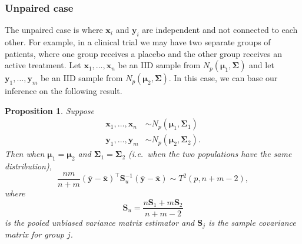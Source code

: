 \documentclass[
]{book}
\newtheorem{proposition}{Proposition}[chapter]
\theoremstyle{definition}
\theoremstyle{definition}
\theoremstyle{definition}
\theoremstyle{definition}
\theoremstyle{remark}
\begin{document}
\subsubsection*{Unpaired case}\label{unpaired-case}

The unpaired case is where \(\mathbf x_i\) and \(\mathbf y_i\) are independent and not connected to each other. For example, in a clinical trial we may have two separate groups of patients, where one group receives a placebo and the other group receives an active treatment. Let \(\mathbf x_1,\ldots,\mathbf x_n\) be an IID sample from \(N_p({\boldsymbol{\mu}}_1,\boldsymbol{\Sigma})\) and let \(\mathbf y_1,\ldots,\mathbf y_m\) be an IID sample from \(N_p({\boldsymbol{\mu}}_2,\boldsymbol{\Sigma})\). In this case, we can base our inference on the following result.

\begin{proposition}
\protect\hypertarget{prp:seven1}{}\label{prp:seven1}Suppose
\begin{align*}
\mathbf x_1,\ldots,\mathbf x_n  &\sim N_p({\boldsymbol{\mu}}_1,\boldsymbol{\Sigma}_1)\\ 
\mathbf y_1,\ldots,\mathbf y_m  &\sim N_p({\boldsymbol{\mu}}_2,\boldsymbol{\Sigma}_2). 
\end{align*}
Then when \({\boldsymbol{\mu}}_1 = {\boldsymbol{\mu}}_2\) and \(\boldsymbol{\Sigma}_1 = \boldsymbol{\Sigma}_2\) (i.e.~when the two populations have the same distribution),
\[\frac{nm}{n+m} (\bar{\mathbf y} - \bar{\mathbf x})^\top \mathbf S_u^{-1} (\bar{\mathbf y} - \bar{\mathbf x}) \sim T^2(p,n+m-2),\]
where
\[\mathbf S_u = \frac{n\mathbf S_1 + m\mathbf S_2}{n+m-2}\]
is the pooled unbiased variance matrix estimator
and \(\mathbf S_j\) is the sample covariance matrix for group \(j\).
\end{proposition}
\end{document}
